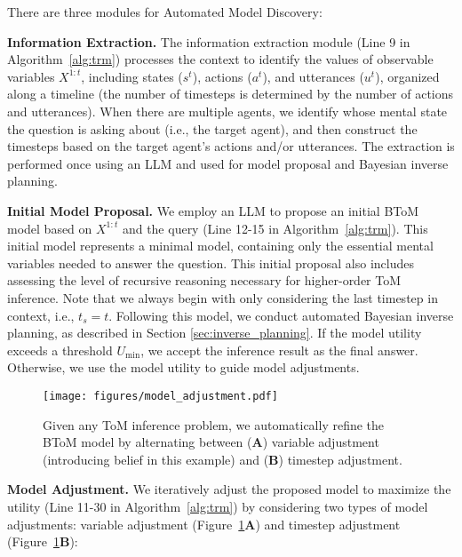There are three modules for Automated Model Discovery:


\textbf{Information Extraction.} The information extraction module (Line 9 in Algorithm~\ref{alg:trm}) processes the context to identify the values of observable variables $X^{1:t}$, including states ($s^t$), actions ($a^t$), and utterances ($u^t$), organized along a timeline (the number of timesteps is determined by the number of actions and utterances). When there are multiple agents, we identify whose mental state the question is asking about (i.e., the target agent), and then construct the timesteps based on the target agent's actions and/or utterances. The extraction is performed once using an LLM and used for model proposal and Bayesian inverse planning.  


\textbf{Initial Model Proposal.} We employ an LLM to propose an initial BToM model based on $X^{1:t}$ and the query (Line 12-15 in Algorithm~\ref{alg:trm}). This initial model represents a minimal model, containing only the essential mental variables needed to answer the question. This initial proposal also includes assessing the level of recursive reasoning necessary for higher-order ToM inference. Note that we always begin with only considering the last timestep in context, i.e., $t_s=t$. Following this model, we conduct automated Bayesian inverse planning, as described in Section \ref{sec:inverse_planning}. If the model utility exceeds a threshold $U_\text{min}$, we accept the inference result as the final answer. Otherwise, we use the model utility to guide model adjustments.

\begin{figure}[t!]
  \centering
  \texttt{[image: figures/model\_adjustment.pdf]}
    \vspace{-10pt}
  \caption{Given any ToM inference problem, we automatically refine the BToM model by alternating between (\textbf{A}) variable adjustment (introducing belief in this example) and  (\textbf{B}) timestep adjustment.}
  \label{fig:model_adjustment}
  \vspace{-10pt}
\end{figure}


\textbf{Model Adjustment.} We iteratively adjust the proposed model to maximize the utility (Line 11-30 in Algorithm~\ref{alg:trm}) by considering two types of model adjustments: variable adjustment (Figure~\ref{fig:model_adjustment}\textbf{A}) and timestep adjustment (Figure~\ref{fig:model_adjustment}\textbf{B}):



